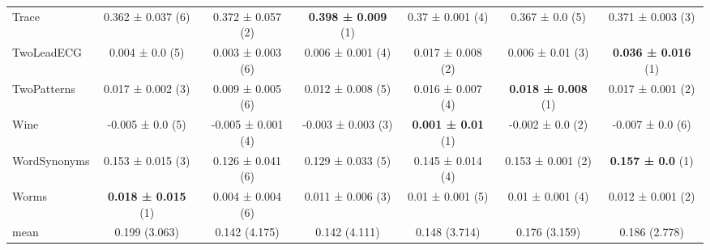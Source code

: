 \begin{table}[ht]
\begin{adjustbox}{width=\textwidth}
\begin{tabular}{lcccccc}
Trace & 0.362 ± 0.037 (6) & 0.372 ± 0.057 (2) & \textbf{0.398 ± 0.009} (1) & 0.37 ± 0.001 (4) & 0.367 ± 0.0 (5) & 0.371 ± 0.003 (3) \\
TwoLeadECG & 0.004 ± 0.0 (5) & 0.003 ± 0.003 (6) & 0.006 ± 0.001 (4) & 0.017 ± 0.008 (2) & 0.006 ± 0.01 (3) & \textbf{0.036 ± 0.016} (1) \\
TwoPatterns & 0.017 ± 0.002 (3) & 0.009 ± 0.005 (6) & 0.012 ± 0.008 (5) & 0.016 ± 0.007 (4) & \textbf{0.018 ± 0.008} (1) & 0.017 ± 0.001 (2) \\
Wine & -0.005 ± 0.0 (5) & -0.005 ± 0.001 (4) & -0.003 ± 0.003 (3) & \textbf{0.001 ± 0.01} (1) & -0.002 ± 0.0 (2) & -0.007 ± 0.0 (6) \\
WordSynonyms & 0.153 ± 0.015 (3) & 0.126 ± 0.041 (6) & 0.129 ± 0.033 (5) & 0.145 ± 0.014 (4) & 0.153 ± 0.001 (2) & \textbf{0.157 ± 0.0} (1) \\
Worms & \textbf{0.018 ± 0.015} (1) & 0.004 ± 0.004 (6) & 0.011 ± 0.006 (3) & 0.01 ± 0.001 (5) & 0.01 ± 0.001 (4) & 0.012 ± 0.001 (2) \\
\hline 
mean & 0.199 (3.063) & 0.142 (4.175) & 0.142 (4.111) & 0.148 (3.714) & 0.176 (3.159) & 0.186 (2.778) \\ 
\hline
\end{tabular}
\end{adjustbox}
\end{table}



